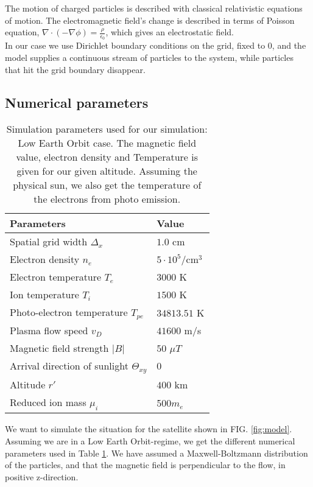 \documentclass[aip, 
rsi, 
amsmath,
amssymb,
longbibliography,
preprint]{revtex4-1}
\begin{document}
The motion of charged particles is described with classical relativistic equations of motion. The electromagnetic field’s change is described in terms of Poisson equation, $\nabla\cdot(-\nabla \phi)=\frac{\rho}{\epsilon_0}$, which gives an electrostatic field\cite{numsetup2}.\\
In our case we use Dirichlet boundary conditions on the grid, fixed to 0, and the model supplies a continuous stream of particles to the system, while particles that hit the grid boundary disappear.

\subsection{Numerical parameters}

\begin{table}
  \centering
  \caption{Simulation parameters used for our simulation: Low Earth Orbit case. The magnetic field value, electron density and Temperature is given for our given altitude. Assuming the physical sun, we also get the temperature of the electrons from photo emission.\label{tab:table1}}
\begin{tabular}{|l|l|}
\hline
\hline
  Parameters & Value  \\
  \hline
   Spatial grid width \(\Delta_x\) & \(1.0\) cm \\
   Electron density \(n_e\) & \(5 \cdot 10^5\)/cm$^3$   \\
   Electron temperature \(T_e\) & \(3000\) K   \\
   Ion temperature \(T_i\) & \(1500\) K \\
   Photo-electron temperature \(T_{pe}\) & \(34813.51\) K  \\
   Plasma flow speed \(v_D\)  & \(41600\) m/s  \\
   Magnetic field strength \(|B|\) & \(50 \)  \(\mu T\) \\
   Arrival direction of sunlight \(\Theta_{xy}\) & \(0\)\\
   Altitude \(r'\) & \(400\) km \\
   Reduced ion mass $\mu_i$ & 500$m_e$ \\
   \hline
\hline
\end{tabular}
\end{table}

We want to simulate the situation for the satellite shown in FIG. \ref{fig:model}. Assuming we are in a Low Earth Orbit-regime, we get the different numerical parameters used in Table \ref{tab:table1}. We have  assumed a Maxwell-Boltzmann distribution of the particles, and that the magnetic field is perpendicular to the flow, in positive z-direction.\\
\end{document}
